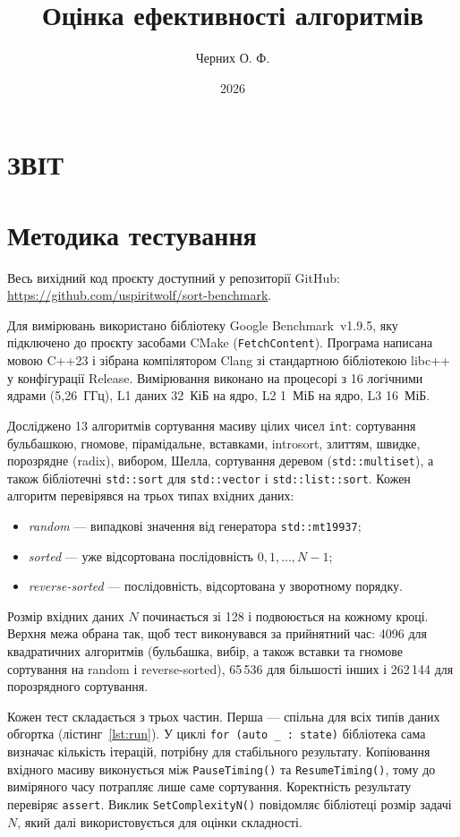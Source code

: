 \documentclass{term-paper}
\title{Оцінка ефективності алгоритмів}
\author{Черних О. Ф.}
\date{2026}
\begin{document}


\tableofcontents

\section*[Звіт]{ЗВІТ}

\section{Методика тестування}

Весь вихідний код проєкту доступний у репозиторії GitHub:\\
\url{https://github.com/uspiritwolf/sort-benchmark}.

\par Для вимірювань використано бібліотеку Google Benchmark~v1.9.5, яку
підключено до проєкту засобами CMake (\texttt{FetchContent}). Програма
написана мовою C++23 і зібрана компілятором Clang зі стандартною бібліотекою
libc++ у конфігурації Release. Вимірювання виконано на процесорі з 16
логічними ядрами (5{,}26~ГГц), L1 даних 32~КіБ на ядро, L2 1~МіБ на ядро,
L3 16~МіБ.

Досліджено 13 алгоритмів сортування масиву цілих чисел \texttt{int}:
сортування бульбашкою, гномове, пірамідальне, вставками, introsort, злиттям,
швидке, порозрядне (radix), вибором, Шелла, сортування деревом
(\texttt{std::multiset}), а також бібліотечні \texttt{std::sort} для
\texttt{std::vector} і \texttt{std::list::sort}. Кожен алгоритм
перевірявся на трьох типах вхідних даних:
\begin{itemize}
    \item \emph{random} --- випадкові значення від генератора
          \texttt{std::mt19937};
    \item \emph{sorted} --- уже відсортована послідовність $0, 1, \dots, N-1$;
    \item \emph{reverse-sorted} --- послідовність, відсортована у зворотному
          порядку.
\end{itemize}

Розмір вхідних даних $N$ починається зі 128 і подвоюється на кожному
кроці. Верхня межа обрана так, щоб тест виконувався за прийнятний час:
4096 для квадратичних алгоритмів (бульбашка, вибір, а також вставки та
гномове сортування на random і reverse-sorted), 65\,536 для більшості
інших і 262\,144 для порозрядного сортування.

Кожен тест складається з трьох частин. Перша --- спільна для всіх типів
даних обгортка (лістинг~\ref{lst:run}). У циклі \texttt{for (auto \_ : state)}
бібліотека сама визначає кількість ітерацій, потрібну для стабільного
результату. Копіювання вхідного масиву виконується між
\texttt{PauseTiming()} та \texttt{ResumeTiming()}, тому до виміряного часу
потрапляє лише саме сортування. Коректність результату перевіряє
\texttt{assert}. Виклик \texttt{SetComplexityN()} повідомляє бібліотеці
розмір задачі $N$, який далі використовується для оцінки складності.
\end{document}
